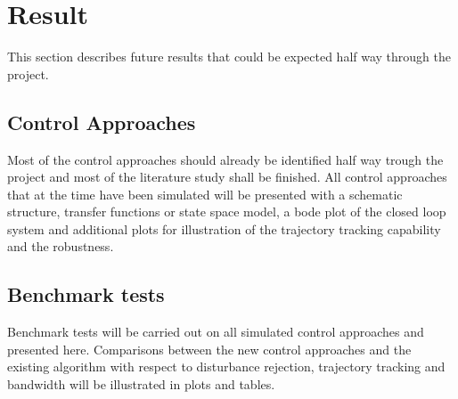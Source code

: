 \chapter{Result}\label{cha:metod}
This section describes future results that could be expected half way through the project.

\section{Control Approaches}
Most of the control approaches should already be identified half way trough the project and most of the literature study shall be finished.
All control approaches that at the time have been simulated will be presented with a schematic structure, transfer functions or state space model, a bode plot of the closed loop system and additional plots for illustration of the trajectory tracking capability and the robustness.

\section{Benchmark tests}
Benchmark tests will be carried out on all simulated control approaches and presented here. Comparisons between the new control approaches and the existing algorithm with respect to disturbance rejection, trajectory tracking and bandwidth will be illustrated in plots and tables.
